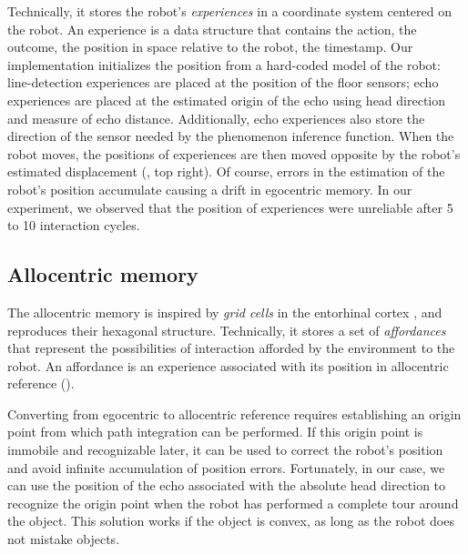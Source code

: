 \documentclass[pmlr]{jmlr}%
\begin{document}
Technically, it stores the robot's \textit{experiences} in a coordinate system centered on the robot.
An experience is a data structure that contains the action, the outcome, the position in space relative to the robot, the timestamp. 
Our implementation initializes the position from a hard-coded model of the robot: line-detection experiences are placed at the position of the floor sensors; echo experiences are placed at the estimated origin of the echo using head direction and measure of echo distance.
Additionally, echo experiences also store the direction of the sensor needed by the phenomenon inference function.
When the robot moves, the positions of experiences are then moved opposite by the robot's estimated displacement (, top right). 
Of course, errors in the estimation of the robot's position accumulate causing a drift in egocentric memory. 
In our experiment, we observed that the position of experiences were unreliable after 5 to 10 interaction cycles.


\subsection{Allocentric memory}

The allocentric memory is inspired by \textit{grid cells} in the entorhinal cortex \citep{grieves_representation_2017}, and reproduces their hexagonal structure. 
Technically, it stores a set of \textit{affordances} that represent the possibilities of interaction afforded by the environment to the robot.  
An affordance is an experience associated with its position in allocentric reference (). 

Converting from egocentric to allocentric reference requires establishing an origin point from which path integration can be performed. 
If this origin point is immobile and recognizable later, it can be used to correct the robot's position and avoid infinite accumulation of position errors.
Fortunately, in our case, we can use the position of the echo associated with the absolute head direction to recognize the origin point when the robot has performed a complete tour around the object.
This solution works if the object is convex, as long as the robot does not mistake objects. 
\end{document}
